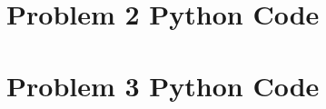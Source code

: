 \documentclass[../main.tex]{subfiles}
\begin{document}
	\begin{appendices}
		\section{Problem 2 Python Code}
		\label{Problem2Python}
		
		\newpage

		\section{Problem 3 Python Code}
		\label{Problem3Python}
		
		\newpage
	\end{appendices}
\end{document}
